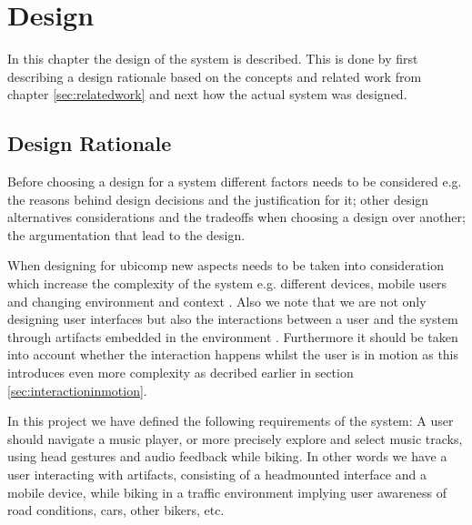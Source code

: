 \chapter{Design}
\label{sec:design}
In this chapter the design of the system is described. This is done by first describing a design rationale based on the concepts and related work from chapter \ref{sec:relatedwork} and next how the actual system was designed.

\section{Design Rationale}


Before choosing a design for a system different factors needs to be considered e.g. the reasons behind design decisions and the justification for it; other design alternatives considerations and the tradeoffs when choosing a design over another; the argumentation that lead to the design.

When designing for ubicomp new aspects needs to be taken into consideration which increase the complexity of the system e.g. different devices, mobile users and changing environment and context \cite{barfield_fundamentals_2000}. Also we note that we are not only designing user interfaces but also the interactions between a user and the system through artifacts embedded in the environment \cite{beaudouin-lafon_designing_2004}. Furthermore it should be taken into account whether the interaction happens whilst the user is in motion as this introduces even more complexity as decribed earlier in section \ref{sec:interactioninmotion}.

In this project we have defined the following requirements of the system: A user should navigate a music player, or more precisely explore and select music tracks, using head gestures and audio feedback while biking. In other words we have a user interacting with artifacts, consisting of a headmounted interface and a mobile device, while biking in a traffic environment implying user awareness of road conditions, cars, other bikers, etc.


